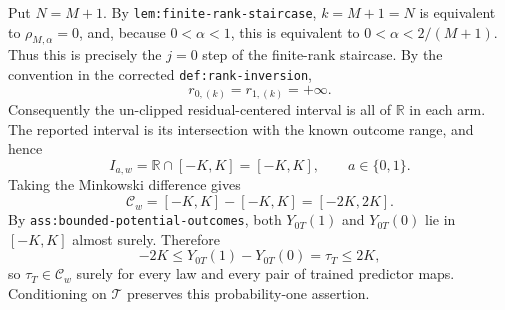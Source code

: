 Put \(N=M+1\). By \texttt{lem:finite-rank-staircase}, \(k=M+1=N\) is equivalent to \(\rho_{M,\alpha}=0\), and, because \(0<\alpha<1\), this is equivalent to \(0<\alpha<2/(M+1)\). Thus this is precisely the \(j=0\) step of the finite-rank staircase. By the convention in the corrected \texttt{def:rank-inversion},
\[r_{0,(k)}=r_{1,(k)}=+\infty.\]
Consequently the un-clipped residual-centered interval is all of \(\mathbb R\) in each arm. The reported interval is its intersection with the known outcome range, and hence
\[I_{a,w}=\mathbb R\cap[-K,K]=[-K,K],\qquad a\in\{0,1\}.\]
Taking the Minkowski difference gives
\[\mathcal C_w=[-K,K]-[-K,K]=[-2K,2K].\]
By \texttt{ass:bounded-potential-outcomes}, both \(Y_{0T}(1)\) and \(Y_{0T}(0)\) lie in \([-K,K]\) almost surely. Therefore
\[-2K\le Y_{0T}(1)-Y_{0T}(0)=\tau_T\le2K,\]
so \(\tau_T\in\mathcal C_w\) surely for every law and every pair of trained predictor maps. Conditioning on \(\mathcal T\) preserves this probability-one assertion.